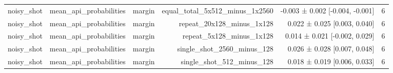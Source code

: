 \begin{table}
\begin{tabular}{lrrrrr}
noisy\_shot & mean\_api\_probabilities & margin & equal\_total\_5x512\_minus\_1x2560 & -0.003 ± 0.002 [-0.004, -0.001] & 6 \\
noisy\_shot & mean\_api\_probabilities & margin & repeat\_20x128\_minus\_1x128 & 0.022 ± 0.025 [0.003, 0.040] & 6 \\
noisy\_shot & mean\_api\_probabilities & margin & repeat\_5x128\_minus\_1x128 & 0.014 ± 0.021 [-0.002, 0.029] & 6 \\
noisy\_shot & mean\_api\_probabilities & margin & single\_shot\_2560\_minus\_128 & 0.026 ± 0.028 [0.007, 0.048] & 6 \\
noisy\_shot & mean\_api\_probabilities & margin & single\_shot\_512\_minus\_128 & 0.018 ± 0.019 [0.006, 0.033] & 6 \\
\bottomrule
\end{tabular}
\end{table}


